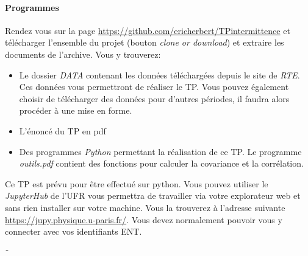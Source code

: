 \documentclass[12pt,a4,french]{article}
\newcommand{\tmtextit}[1]{{\itshape{#1}}}
\begin{document}
\paragraph{Programmes}
Rendez vous sur la page \href{https://github.com/ericherbert/TPintermittence}{https://github.com/ericherbert/TPintermittence} et télécharger l'ensemble du projet (bouton \tmtextit{clone or download}) et extraire les
documents de l'archive. Vous y trouverez:
\begin{itemize}
  \item Le dossier \tmtextit{DATA} contenant les données téléchargées depuis le site de \tmtextit{RTE}. Ces données vous permettront de réaliser le TP. Vous pouvez également choisir de télécharger des données pour d'autres périodes, il faudra alors procéder à une mise en forme.
  
  \item L'énoncé du TP en pdf
  
  \item Des programmes \tmtextit{Python} permettant la réalisation de ce TP. Le programme \textit{outils.pdf} contient des fonctions pour calculer la covariance et la corrélation.
\end{itemize}
Ce TP est prévu pour être effectué sur python. Vous pouvez utiliser le \tmtextit{JupyterHub} de l'UFR vous permettra de travailler via votre explorateur web et sans rien installer sur votre machine. Vous la trouverez à l'adresse suivante
\href{https://jupy.physique.u-paris.fr/}{https://jupy.physique.u-paris.fr/}. Vous devez normalement pouvoir vous y connecter avec vos identifiants ENT.



¨
%  
%  
%  
%  
\end{document}
